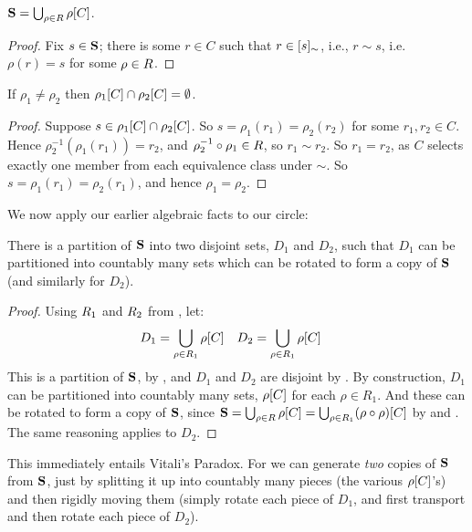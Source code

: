 \documentclass[../../../include/open-logic-section]{subfiles}
\begin{document}
\begin{lem}
$\onesphere = \bigcup_{\rho \in \rotationsgroup} \funimage{\rho}{C}$.
\end{lem}

\begin{proof}
Fix $s \in \onesphere$; there is some $r \in C$ such that $r \in
\equivrep{s}{\sim}$, i.e., $r \sim s$, i.e.\ $\rho(r) = s$ for some
$\rho \in \rotationsgroup$. 
\end{proof}

\begin{lem}
If $\rho_1 \neq \rho_2$ then $\funimage{\rho_1}{C} \cap \funimage{\rho_2}{C} = \emptyset$. 
\end{lem}

\begin{proof}
Suppose $s \in \funimage{\rho_{1}}{C} \cap \funimage{\rho_{2}}{C}$. So
$s = \rho_{1}(r_{1}) = \rho_{2}(r_{2})$ for some $r_{1}, r_{2} \in C$.
Hence $\rho^{-1}_2(\rho_1(r_1)) = r_2$, and
$\comp{\rho_1}{\rho^{-1}_2} \in \rotationsgroup$, so $r_{1} \sim
r_{2}$. So $r_1 = r_2$, as $C$ selects exactly one member from each
equivalence class under $\sim$. So $s = \rho_1(r_1) = \rho_2(r_1)$,
and hence $\rho_1 = \rho_2$.
\end{proof}

We now apply our earlier algebraic facts to our circle:

\begin{lem}
There is a partition of $\onesphere$ into two disjoint sets, $D_{1}$
and $D_{2}$, such that $D_{1}$ can be partitioned into countably many
sets which can be rotated to form a copy of $\onesphere$ (and
similarly for $D_{2}$).
\end{lem}

\begin{proof}
Using $\rotationsgroup_{1}$ and $\rotationsgroup_{2}$ from , let:
\begin{align*}
	D_{1} &= \bigcup_{\rho \in \rotationsgroup_1} \funimage{\rho}{C} & 
	D_{2} &= \bigcup_{\rho \in \rotationsgroup_1} \funimage{\rho}{C}
\end{align*}
This is a partition of $\onesphere$, by , and $D_1$
and $D_2$ are disjoint by . By construction,
$D_1$ can be partitioned into countably many sets,
$\funimage{\rho}{C}$ for each $\rho \in R_1$. And these can be rotated
to form a copy of $\onesphere$, since $\onesphere = \bigcup_{\rho \in
\rotationsgroup}\funimage{\rho}{C} = \bigcup_{\rho \in
\rotationsgroup_1}\funimage{(\comp{\rho}{\rho})}{C}$ by
 and . The same reasoning
applies to $D_2$. \end{proof}\noindent This immediately entails
Vitali's Paradox. For we can generate \emph{two} copies of
$\onesphere$ from $\onesphere$, just by splitting it up into countably
many pieces (the various $\funimage{\rho}{C}$'s) and then rigidly
moving them (simply rotate each piece of $D_1$, and first transport
and then rotate each piece of $D_2$).
\end{document}
